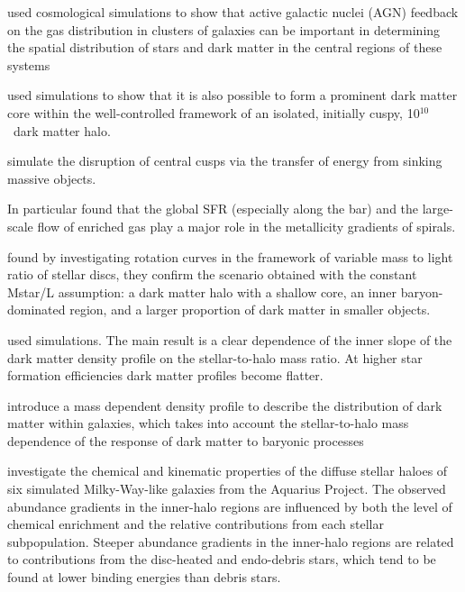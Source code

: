 \documentclass[11pt, a4paper, onecolumn]{article}
\begin{document}
\begin{multicols}{2}
    \citet{martizzi13} used cosmological simulations to show that active
    galactic nuclei (AGN) feedback on the gas distribution in clusters of
    galaxies can be important in determining the spatial distribution of stars
    and dark matter in the central regions of these systems

    \citet{teyssier13} used simulations to show that it is also possible to
    form a prominent dark matter core within the well-controlled framework of
    an isolated, initially cuspy, 10$^{10}$ \msun\ dark matter halo.

    \citet{goerdt10} simulate the disruption of central cusps via the transfer
    of energy from sinking massive objects.



    In particular 
    \citet{martel13} found that the global SFR (especially along the bar) and
    the large-scale flow of enriched gas play a major role in the metallicity
    gradients of spirals.

    \citet{portinari10} found by investigating rotation curves in the framework
    of variable mass to light ratio of stellar discs, they confirm the scenario
    obtained with the constant Mstar/L assumption: a dark matter halo with a
    shallow core, an inner baryon-dominated region, and a larger proportion of
    dark matter in smaller objects.


    \citet{dicintio14} used simulations. The main result is a clear dependence
    of the inner slope of the dark matter density profile on the
    stellar-to-halo mass ratio. At higher star formation efficiencies dark
    matter profiles become flatter. 

    \citet{dicintio14b} introduce a mass dependent density profile to describe
    the distribution of dark matter within galaxies, which takes into account
    the stellar-to-halo mass dependence of the response of dark matter to
    baryonic processes

    \citet{tissera13} investigate the chemical and kinematic properties of the
    diffuse stellar haloes of six simulated Milky-Way-like galaxies from the
    Aquarius Project. The observed abundance gradients in the inner-halo
    regions are influenced by both the level of chemical enrichment and the
    relative contributions from each stellar subpopulation. Steeper abundance
    gradients in the inner-halo regions are related to contributions from the
    disc-heated and endo-debris stars, which tend to be found at lower binding
    energies than debris stars. 


\end{multicols}
\end{document}

